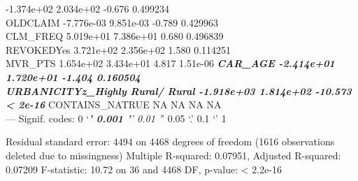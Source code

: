 \documentclass[]{article}
\begin{document}
-1.374e+02 2.034e+02 -0.676 0.499234\\
OLDCLAIM -7.776e-03 9.851e-03 -0.789 0.429963\\
CLM\_FREQ 5.019e+01 7.386e+01 0.680 0.496839\\
REVOKEDYes 3.721e+02 2.356e+02 1.580 0.114251\\
MVR\_PTS 1.654e+02 3.434e+01 4.817 1.51e-06 \textbf{\emph{ CAR\_AGE
-2.414e+01 1.720e+01 -1.404 0.160504\\
URBANICITYz\_Highly Rural/ Rural -1.918e+03 1.814e+02 -10.573
\textless{} 2e-16 }} CONTAINS\_NATRUE NA NA NA NA\\
--- Signif. codes: 0 `\emph{\textbf{' 0.001 '}' 0.01 '}' 0.05 `.' 0.1 `'
1

Residual standard error: 4494 on 4468 degrees of freedom (1616
observations deleted due to missingness) Multiple R-squared: 0.07951,
Adjusted R-squared: 0.07209 F-statistic: 10.72 on 36 and 4468 DF,
p-value: \textless{} 2.2e-16
\end{document}
